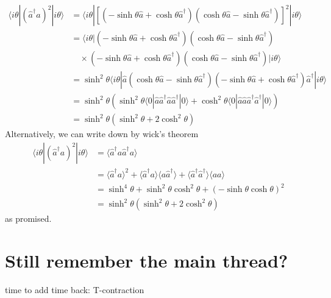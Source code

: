 \begin{align*}
    \langle i\theta |\left( \hat{a}^{\dagger}a \right) ^2|i\theta \rangle &=\langle i\theta |\left[ \left( -\sinh \theta \hat{a}+\cosh \theta \hat{a}^{\dagger} \right) \left( \cosh \theta \hat{a}-\sinh \theta \hat{a}^{\dagger} \right) \right] ^2|i\theta \rangle \\
    &=\langle i\theta |\left( -\sinh \theta \hat{a}+\cosh \theta \hat{a}^{\dagger} \right) \left( \cosh \theta \hat{a}-\sinh \theta \hat{a}^{\dagger} \right) \\
    &\quad\times \left( -\sinh \theta \hat{a}+\cosh \theta \hat{a}^{\dagger} \right) \left( \cosh \theta \hat{a}-\sinh \theta \hat{a}^{\dagger} \right) |i\theta \rangle \\
    &=\sinh ^2\theta \langle i\theta |\hat{a}\left( \cosh \theta \hat{a}-\sinh \theta \hat{a}^{\dagger} \right) \left( -\sinh \theta \hat{a}+\cosh \theta \hat{a}^{\dagger} \right) \hat{a}^{\dagger}|i\theta \rangle \\
    &=\sinh ^2\theta \left( \sinh ^2\theta \langle 0|\hat{a}\hat{a}^{\dagger}\hat{a}\hat{a}^{\dagger}|0\rangle +\cosh ^2\theta \langle 0|\hat{a}\hat{a}\hat{a}^{\dagger}\hat{a}^{\dagger}|0\rangle \right) \\
    &=\sinh ^2\theta \left( \sinh ^2\theta +2\cosh ^2\theta \right)
\end{align*}
Alternatively, we can write down by wick's theorem
\begin{align*}
    \langle i\theta |\left( \hat{a}^{\dagger}a \right) ^2|i\theta \rangle &=\langle \hat{a}^{\dagger}a\hat{a}^{\dagger}a\rangle \\
    &=\langle \hat{a}^{\dagger}a\rangle ^2+\langle \hat{a}^{\dagger}a\rangle \langle a\hat{a}^{\dagger}\rangle +\langle \hat{a}^{\dagger}\hat{a}^{\dagger}\rangle \langle aa\rangle \\
    &=\sinh ^4\theta +\sinh ^2\theta \cosh ^2\theta +\left( -\sinh \theta \cosh \theta \right) ^2\\
    &=\sinh ^2\theta \left( \sinh ^2\theta +2\cosh ^2\theta \right)
\end{align*}
as promised.

\section{Still remember the main thread?}

time to add time back: T-contraction

